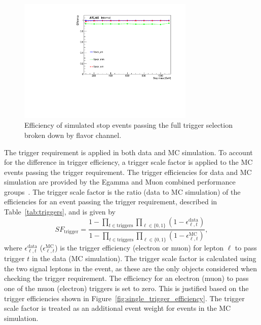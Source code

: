 \begin{figure}[bh]
  \centering
  \includegraphics[width=0.75\textwidth]
    {figs/trigger/EF_e24vhi_medium1_OR_EF_e60_medium1_OR_EF_mu24i_tight_OR_EF_mu36_tight.pdf}
  \caption{
    Efficiency of simulated stop events passing the full trigger
    selection broken down by flavor channel.
  }
  \label{fig:full_trigger_efficiency}
\end{figure}

The trigger requirement is applied in both data and MC simulation.
To account for the difference in trigger efficiency, a trigger scale factor is
applied to the MC events passing the trigger requirement.
The trigger efficiencies for data and MC simulation are provided by
the Egamma and Muon combined performance
groups~\cite{ATLAS-CONF-2014-032,Aad:2014rra}.
The trigger scale factor is the ratio (data to MC simulation) of the
efficiencies for an event passing the trigger requirement, described in
Table~\ref{tab:triggers}, and is given by
\begin{equation}
  SF_\mathrm{trigger} =
  \frac{1- \prod_{t \in \mathrm{triggers}}\prod_{\ell \in \{0,1\}}
                 (1-\epsilon_{\ell, t}^\mathrm{data})}
       {1- \prod_{t \in \mathrm{triggers}}\prod_{\ell \in \{0,1\}}
                 (1-\epsilon_{\ell, t}^\mathrm{MC})},
\end{equation}
where $\epsilon_{\ell,t}^\mathrm{data}$ ($\epsilon_{\ell,t}^\mathrm{MC}$) is
the trigger efficiency (electron or muon) for lepton $\ell$ to pass trigger $t$
in the data (MC simulation).
The trigger scale factor is calculated using the two signal leptons in the
event, as these are the only objects considered when checking the trigger
requirement.
The efficiency for an electron (muon) to pass one of the muon (electron)
triggers is set to zero.
This is justified based on the trigger efficiencies shown in
Figure~\ref{fig:single_trigger_efficiency}.
The trigger scale factor is treated as an additional event weight for events in
the MC simulation.

